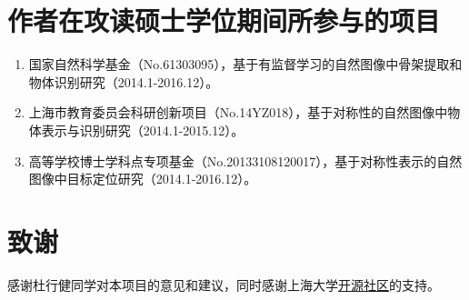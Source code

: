 \documentclass[UTF8, fontset=windows]{ctexart}
\numberwithin{equation}{section} %
\numberwithin{table}{section} %
\begin{document}
\pagebreak
\section*{作者在攻读硕士学位期间所参与的项目}
\begin{enumerate}
\item 国家自然科学基金（No.61303095），基于有监督学习的自然图像中骨架提取和物体识别研究（2014.1-2016.12）。
\item 上海市教育委员会科研创新项目（No.14YZ018），基于对称性的自然图像中物体表示与识别研究（2014.1-2015.12）。
\item 高等学校博士学科点专项基金（No.20133108120017），基于对称性表示的自然图像中目标定位研究（2014.1-2016.12）。

\end{enumerate}

\pagebreak
\section*{致谢}
感谢杜行健同学对本项目的意见和建议，同时感谢上海大学\href{https://www.shuosc.org/}{开源社区}的支持。
\end{document}
